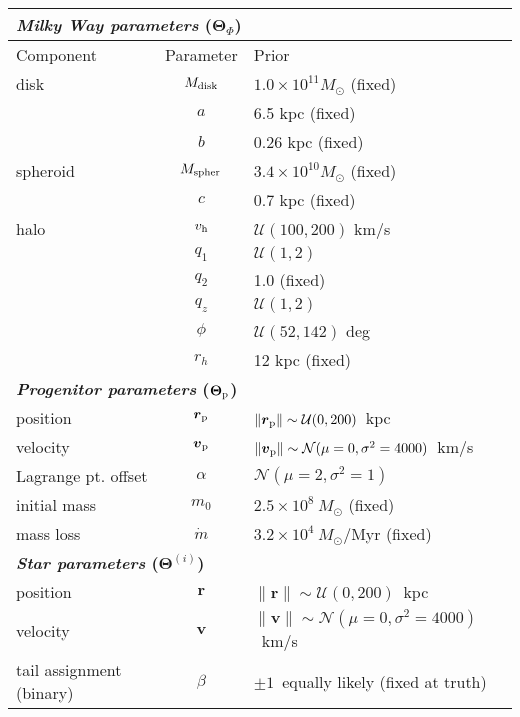 \documentclass[letterpaper,12pt,preprint]{aastex}
\newcommand{\bs}{\boldsymbol}
\newcommand{\sat}{{\rm p}}
\newcommand{\pshock}{P_{\rm shock}}
\newcommand{\vhalo}{v_{\rm h}}
\begin{document}
\begin{table}[h]
\begin{center}
	\begin{tabular}{l c l} \toprule
		\multicolumn{3}{l}{{\bf \emph{Milky Way parameters} ($\bs{\Theta}_\Phi$)}} \\
		\toprule
		Component & Parameter & Prior \\\toprule
		disk & $M_{\rm disk}$ & $1.0\times10^{11}M_\odot$ (fixed) \\ 
		& $a$ & 6.5 kpc (fixed)\\
		& $b$ & 0.26 kpc (fixed)\\
		\midrule
		spheroid & $M_{\rm spher}$ & $3.4\times10^{10}M_\odot$ (fixed)\\ 
		& $c$ & 0.7 kpc (fixed)\\
		\midrule
		halo & $\vhalo$ & $\mathcal{U}(100,200)$ km/s \\
		& $q_1$ & $\mathcal{U}(1,2)$\\
		& $q_2$ & 1.0 (fixed)\\
		& $q_z$ & $\mathcal{U}(1,2)$\\
		& $\phi$ & $\mathcal{U}(52,142)$ deg\\
		& $r_h$ & 12 kpc (fixed)\\
		\toprule
		\multicolumn{3}{l}{{\bf \emph{Progenitor parameters} ($\bs{\Theta}_\sat$)}} \\
		\toprule
		position & $\bs{r}_\sat$ & $\|\bs{r}_\sat\|\sim\mathcal{U}(0,200)$~kpc \\
		velocity & $\bs{v}_\sat$ & $\|\bs{v}_\sat\|\sim\mathcal{N}(\mu=0,\sigma^2=4000)$~km/s\\
		Lagrange pt. offset & $\alpha$ & $\mathcal{N}(\mu=2,\sigma^2=1)$\\
		initial mass & $m_0$ & $2.5\times10^8~M_\odot$ (fixed)\\
		mass loss & $\dot{m}$ & $3.2\times10^4~M_\odot$/Myr (fixed)\\
		\toprule
		\multicolumn{3}{l}{{\bf \emph{Star parameters} ($\bs{\Theta}^{(i)}$)}} \\
		\toprule
		position & $\bs{r}$ & $\|\bs{r}\|\sim\mathcal{U}(0,200)$~kpc \\
		velocity & $\bs{v}$ & $\|\bs{v}\|\sim\mathcal{N}(\mu=0,\sigma^2=4000)$~km/s\\
		tail assignment (binary) & $\beta$ & $\pm1$~equally likely (fixed at truth)\\ %

\end{tabular}
\end{center}
\end{table}
\end{document}
